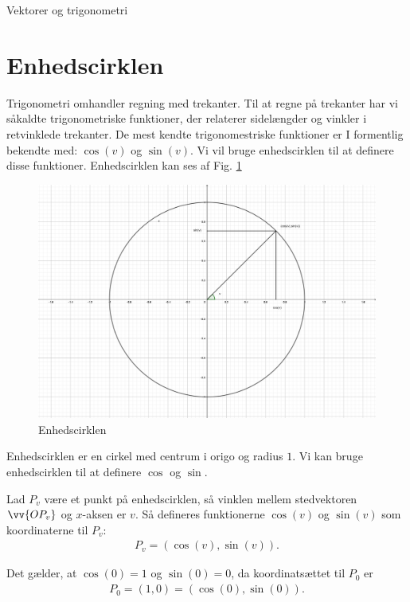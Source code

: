 \begin{center}
\Huge
Vektorer og trigonometri
\end{center}

\section*{Enhedscirklen}

Trigonometri omhandler regning med trekanter. Til at regne på trekanter har vi såkaldte trigonometriske funktioner, der relaterer sidelængder og vinkler i retvinklede trekanter. De mest kendte trigonomestriske funktioner er I formentlig bekendte med: $\cos(v)$ og $\sin(v)$. Vi vil bruge enhedscirklen til at definere disse funktioner. Enhedscirklen kan ses af Fig. \ref{fig:enhed}
\begin{figure}[H]
\includegraphics[width=\textwidth]{Billeder/enhedscirkel.png}
\caption{Enhedscirklen}
\label{fig:enhed}
\end{figure}
Enhedscirklen er en cirkel med centrum i origo og radius $1$. Vi kan bruge enhedscirklen til at definere $\cos$ og $\sin$.
\begin{defn}
Lad $P_v$ være et punkt på enhedscirklen, så vinklen mellem stedvektoren $\vv{OP_v}$ og $x$-aksen er $v$. Så defineres funktionerne $\cos(v)$ og $\sin(v)$ som koordinaterne til $P_v$:
\begin{align*}
P_v = (\cos(v),\sin(v)).
\end{align*}
\end{defn}

\begin{exa}
Det gælder, at $\cos(0) = 1$ og $\sin(0)=0$, da koordinatsættet til $P_0$ er 
\begin{align*}
P_0 = (1,0) = (\cos(0),\sin(0)).
\end{align*}
\end{exa}

